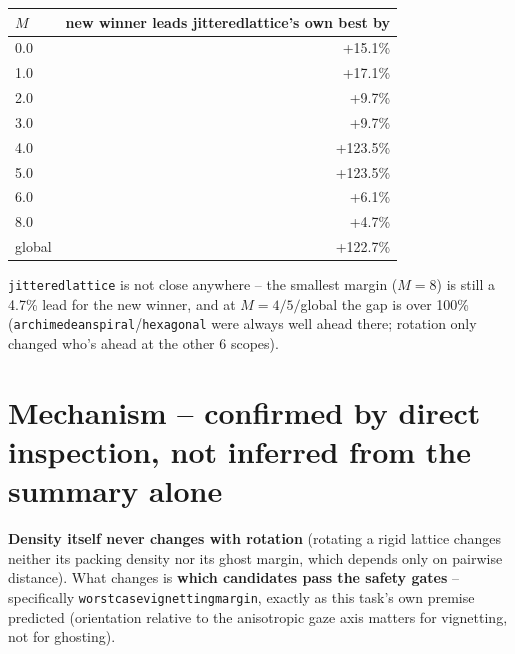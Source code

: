 \documentclass[11pt]{article}
\renewcommand{\_}{\origunderscore\penalty0\hskip0pt\relax}
\begin{document}
\begin{table}[h]
\centering\small
\begin{tabular}{lr}
\toprule
\textbf{$M$} & \textbf{new winner leads jittered\_lattice's own best by} \\
\midrule
0.0 & +15.1\% \\
1.0 & +17.1\% \\
2.0 & +9.7\% \\
3.0 & +9.7\% \\
4.0 & +123.5\% \\
5.0 & +123.5\% \\
6.0 & +6.1\% \\
8.0 & +4.7\% \\
global & +122.7\% \\
\bottomrule
\end{tabular}
\end{table}

\texttt{jittered\_lattice} is not close anywhere -- the smallest margin ($M=8$)
is still a 4.7\% lead for the new winner, and at $M=4/5/$global the gap is over
100\% (\texttt{archimedean\_spiral}/\texttt{hexagonal} were always well ahead
there; rotation only changed who's ahead at the other 6 scopes).

\section{Mechanism -- confirmed by direct inspection, not inferred from the summary alone}
\label{sec:mechanism}
\textbf{Density itself never changes with rotation} (rotating a rigid lattice
changes neither its packing density nor its ghost margin, which depends only on
pairwise distance). What changes is \textbf{which candidates pass the safety
gates} -- specifically \texttt{worst\_case\_vignetting\_margin}, exactly as this
task's own premise predicted (orientation relative to the anisotropic gaze axis
matters for vignetting, not for ghosting).
\end{document}
